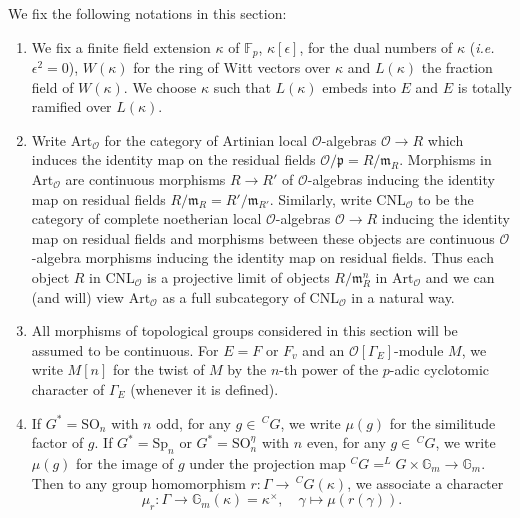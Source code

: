\documentclass[12pt,oneside,reqno]{amsart}
\newcommand{\G}{\mathbb{G}}
\theoremstyle{plain}
\begin{document}
	
	We fix the following notations in
	this section:
	\begin{enumerate}
		\item 
		We fix a finite field extension $\kappa$ of $\mathbb{F}_p$, $\kappa[\epsilon]$, for the dual numbers of $\kappa$
		(\emph{i.e.} $\epsilon^2=0$), $W(\kappa)$ for the ring of Witt vectors over
		$\kappa$ and $L(\kappa)$ the fraction field of $W(\kappa)$. We choose $\kappa$ such that $L(\kappa)$ embeds into $E$ and $E$ is totally ramified over $L(\kappa)$.
		
		
		
		\item 
		Write $\mathrm{Art}_\mathcal{O}$ for the category of Artinian local $\mathcal{O}$-algebras $\mathcal{O}\rightarrow R$ which induces the identity map on the residual fields $\mathcal{O}/\mathfrak{p}
		=R/\mathfrak{m}_R$.	Morphisms in $\mathrm{Art}_\mathcal{O}$
		are continuous morphisms $R\rightarrow R'$ of $\mathcal{O}$-algebras
		inducing the identity map on residual fields $R/\mathfrak{m}_R=R'/\mathfrak{m}_{R'}$. Similarly, write $\mathrm{CNL}_\mathcal{O}$ to be the category of complete noetherian local $\mathcal{O}$-algebras $\mathcal{O}\rightarrow R$	inducing the identity map on residual fields and morphisms between these objects are continuous $\mathcal{O}$-algebra morphisms inducing the identity map on residual fields. Thus each object $R$ in $\mathrm{CNL}_\mathcal{O}$
		is a projective limit of objects $R/\mathfrak{m}_R^n$ in $\mathrm{Art}_\mathcal{O}$ and we can (and will) view $\mathrm{Art}_\mathcal{O}$ as a full subcategory of $\mathrm{CNL}_\mathcal{O}$ in a natural way.
		
		
		
		\item 
		All morphisms of topological groups
		considered in this section
		will be assumed to be continuous.
		For $E=F$ or $F_v$ and an
		$\mathcal{O}[\Gamma_E]$-module
		$M$,
		we write
		$M[n]$
		for the twist of $M$ by the
		$n$-th power of the
		$p$-adic cyclotomic character of
		$\Gamma_E$
		(whenever it is defined).
		
		
		
		
		\item 
		If $G^\ast=\mathrm{SO}_n$ with $n$ odd, for any $g\in\,^CG$, we write $\mu(g)$ for the similitude factor of $g$. If $G^\ast=\mathrm{Sp}_n$ or $G^\ast=\mathrm{SO}_n^\eta$ with $n$ even, for any $g\in\,^CG$, we write $\mu(g)$ for the image of $g$ under the projection map $^CG=^LG\times\G_m\to\G_m$. Then to any group homomorphism $r\colon\Gamma\to\,^CG(\kappa)$, we associate a character
		\begin{equation}\label{mu_r}
			\mu_r\colon\Gamma\to\G_m(\kappa)=\kappa^\times,
			\quad
			\gamma\mapsto\mu(r(\gamma)).
		\end{equation}
	\end{enumerate}
	
\end{document}
